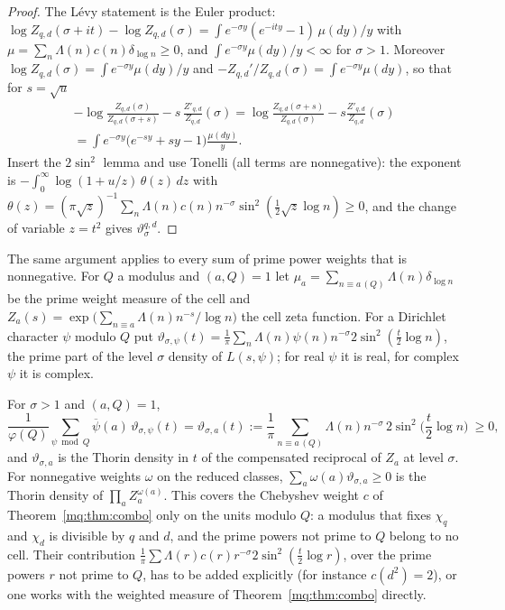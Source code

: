 \begin{proof}
The L\'evy statement is the Euler product: $\log Z_{q,d}(\sigma+it)-\log Z_{q,d}(\sigma)=\int e^{-\sigma y}(e^{-ity}-1)\,\mu(dy)/y$ with $\mu=\sum_n\Lambda(n)c(n)\delta_{\log n}\ge0$, and $\int e^{-\sigma y}\mu(dy)/y<\infty$ for $\sigma>1$. Moreover $\log Z_{q,d}(\sigma)=\int e^{-\sigma y}\mu(dy)/y$ and $-Z_{q,d}'/Z_{q,d}(\sigma)=\int e^{-\sigma y}\mu(dy)$, so that for $s=\sqrt u$
\begin{multline*}
-\log\frac{Z_{q,d}(\sigma)}{Z_{q,d}(\sigma+s)}-s\,\frac{Z'_{q,d}}{Z_{q,d}}(\sigma)=\log\frac{Z_{q,d}(\sigma+s)}{Z_{q,d}(\sigma)}-s\frac{Z'_{q,d}}{Z_{q,d}}(\sigma)\\=\int e^{-\sigma y}\big(e^{-sy}+sy-1\big)\frac{\mu(dy)}y .
\end{multline*}
Insert the $2\sin^2$ lemma and use Tonelli (all terms are nonnegative): the exponent is $-\int_0^\infty\log(1+u/z)\,\theta(z)\,dz$ with $\theta(z)=(\pi\sqrt z)^{-1}\sum_n\Lambda(n)c(n)n^{-\sigma}\sin^2(\frac12\sqrt z\log n)\ge0$, and the change of variable $z=t^2$ gives $\vartheta^{q,d}_\sigma$.
\end{proof}

The same argument applies to every sum of prime power weights that is nonnegative. For $Q$ a modulus and $(a,Q)=1$ let $\mu_a=\sum_{n\equiv a\,(Q)}\Lambda(n)\delta_{\log n}$ be the prime weight measure of the cell and $Z_a(s)=\exp\big(\sum_{n\equiv a}\Lambda(n)n^{-s}/\log n\big)$ the cell zeta function. For a Dirichlet character $\psi$ modulo $Q$ put $\vartheta_{\sigma,\psi}(t)=\frac1\pi\sum_n\Lambda(n)\psi(n)n^{-\sigma}2\sin^2(\frac t2\log n)$, the prime part of the level $\sigma$ density of $L(s,\psi)$; for real $\psi$ it is real, for complex $\psi$ it is complex.

\begin{theorem}\label{mq:thm:cells}
For $\sigma>1$ and $(a,Q)=1$,
\[
\frac1{\varphi(Q)}\sum_{\psi\bmod Q}\overline\psi(a)\,\vartheta_{\sigma,\psi}(t)=\vartheta_{\sigma,a}(t):=\frac1\pi\sum_{n\equiv a\,(Q)}\Lambda(n)n^{-\sigma}\,2\sin^2\!\Big(\frac t2\log n\Big)\ \ge0,
\]
and $\vartheta_{\sigma,a}$ is the Thorin density in $t$ of the compensated reciprocal of $Z_a$ at level $\sigma$. For nonnegative weights $\omega$ on the reduced classes, $\sum_a\omega(a)\vartheta_{\sigma,a}\ge0$ is the Thorin density of $\prod_aZ_a^{\omega(a)}$. This covers the Chebyshev weight $c$ of Theorem~\ref{mq:thm:combo} only on the units modulo $Q$: a modulus that fixes $\chi_q$ and $\chi_d$ is divisible by $q$ and $d$, and the prime powers not prime to $Q$ belong to no cell. Their contribution $\frac1\pi\sum\Lambda(r)c(r)r^{-\sigma}2\sin^2(\frac t2\log r)$, over the prime powers $r$ not prime to $Q$, has to be added explicitly (for instance $c(d^2)=2$), or one works with the weighted measure of Theorem~\ref{mq:thm:combo} directly.
\end{theorem}

